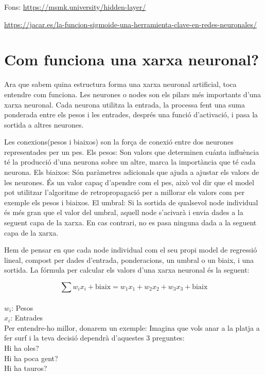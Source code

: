 Fons: \href{https://msmk.university/hidden-layer/}{https://msmk.university/hidden-layer/}


\href{https://jacar.es/la-funcion-sigmoide-una-herramienta-clave-en-redes-neuronales/}{https://jacar.es/la-funcion-sigmoide-una-herramienta-clave-en-redes-neuronales/}

\section{Com funciona una xarxa neuronal?}\label{sec:3.8}
Ara que sabem quina estructura forma una xarxa neuronal artificial, toca entendre com funciona. Les neurones o nodes son els pilars més importants d'una xarxa neuronal. Cada neurona utilitza la entrada, la processa fent una suma ponderada entre els pesos i les entrades, després una funció d'activació, i pasa la sortida a altres neurones.

Les conexions(pesos i biaixos) son la força de conexió entre dos neurones representades per un pes.
Els pesos: Son valors que determinen cuánta influència té la producció d'una neurona sobre un altre, marca la importància que té cada neurona.
Els biaixos: Són paràmetres adicionals que ajuda a ajustar els valors de les neurones. És un valor capaç d'apendre com el pes, això vol dir que el model pot utilitzar l'algoritme de retropropagació per a millorar els valors com per exemple els pesos i biaixos.
El umbral: Si la sortida de qualsevol node individual és més gran que el valor del umbral, aquell node s'acivarà i envia dades a la seguent capa de la xarxa. En cas contrari, no es pasa ninguna dada a la seguent capa de la xarxa.

Hem de pensar en que cada node individual com el seu propi model de regressió lineal, compost per dades d'entrada, ponderacions, un umbral o un biaix, i una sortida. La fórmula per calcular els valors d'una xarxa neuronal és la seguent:

\[
\sum w_i x_i + \text{biaix} = w_1 x_1 + w_2 x_2 + w_3 x_3 + \text{biaix}
\] \\

$w_i$: Pesos\\
$x_i$: Entrades\\


Per entendre-ho millor, donarem un exemple: Imagina que vols anar a la platja a fer surf i la teva decisió dependrà d'aquestes 3 preguntes:\\

Hi ha oles?\\
Hi ha poca gent?\\
Hi ha tauros?\\

